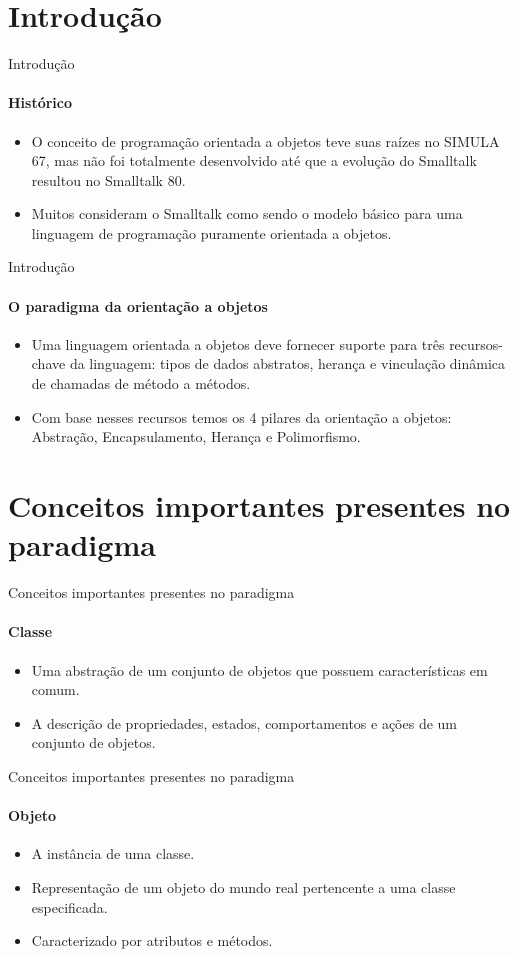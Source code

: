 \section{Introdução}

\begin{frame}{Introdução}
\framesubtitle{Histórico}
\begin{itemize}
    \item O conceito de programação orientada a objetos teve suas raízes no SIMULA 67, mas não foi totalmente desenvolvido até que a evolução do Smalltalk resultou no Smalltalk 80. 
    \item Muitos consideram o Smalltalk como sendo o modelo básico para uma linguagem de programação puramente orientada a objetos.
\end{itemize} 
\end{frame}

\begin{frame}{Introdução}
\framesubtitle{O paradigma da orientação a objetos}
\begin{itemize}
    \item Uma linguagem orientada a objetos deve fornecer suporte para três recursos-chave da linguagem: tipos de dados abstratos, herança e vinculação dinâmica de chamadas de método a métodos.
    \item Com base nesses recursos temos os 4 pilares da orientação a objetos: Abstração, Encapsulamento, Herança e Polimorfismo.
\end{itemize} 
\end{frame}

\section{Conceitos importantes presentes no paradigma}

\begin{frame}{Conceitos importantes presentes no paradigma}
\framesubtitle{Classe}
\begin{itemize}
    \item Uma abstração de um conjunto de objetos que possuem características em comum.
    \item A descrição de propriedades, estados, comportamentos e ações de um conjunto de objetos.
\end{itemize} 
\end{frame}

\begin{frame}{Conceitos importantes presentes no paradigma}
\framesubtitle{Objeto}
\begin{itemize}
    \item A instância de uma classe.
    \item Representação de um objeto do mundo real pertencente a uma classe especificada.
    \item Caracterizado por atributos e métodos.
\end{itemize} 
\end{frame}

